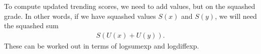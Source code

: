 \documentclass[a4paper, 12pt]{article}
\begin{document}
To compute updated trending scores, we need to add values, but on the
squashed grade. In other words, if we have squashed values $S(x)$ and
$S(y)$, we will need the squashed sum
\begin{align}
S(U(x) + U(y)).
\end{align}
These can be worked out in terms of logsumexp and logdiffexp.



\end{document}
